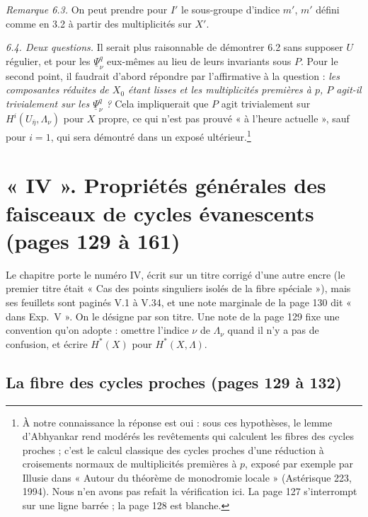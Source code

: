 \documentclass[11pt,a4paper]{article}
\begin{document}
\emph{Remarque 6.3.} On peut prendre pour $I'$ le sous-groupe d'indice $m'$, $m'$
défini comme en 3.2 à partir des multiplicités sur $X'$.

\emph{6.4. Deux questions.} Il serait plus raisonnable de démontrer 6.2 sans
supposer $U$ régulier, et pour les $\underline\Psi^q_\nu$ eux-mêmes au lieu de
leurs invariants sous $P$. Pour le second point, il faudrait d'abord répondre par
l'affirmative à la question : \emph{les composantes réduites de $X_0$ étant
lisses et les multiplicités premières à $p$, $P$ agit-il trivialement sur les
$\underline\Psi^q_\nu$ ?} Cela impliquerait que $P$ agit trivialement sur
$H^i(U_{\bar\eta}, \Lambda_\nu)$ pour $X$ propre, ce qui n'est pas prouvé
« à l'heure actuelle », sauf pour $i = 1$, qui sera démontré dans un exposé
ultérieur.\footnote{À notre connaissance la réponse est oui : sous ces
hypothèses, le lemme d'Abhyankar rend modérés les revêtements qui calculent les
fibres des cycles proches ; c'est le calcul classique des cycles proches d'une
réduction à croisements normaux de multiplicités premières à $p$, exposé par
exemple par Illusie dans « Autour du théorème de monodromie locale »
(Astérisque 223, 1994). Nous n'en avons pas
refait la vérification ici. La page 127 s'interrompt sur une ligne barrée ; la
page 128 est blanche.}

\section*{« IV ». Propriétés générales des faisceaux de cycles évanescents (pages 129 à 161)}

Le chapitre porte le numéro IV, écrit sur un titre corrigé d'une autre encre
(le premier titre était « Cas des points singuliers isolés de la fibre spéciale »),
mais ses feuillets sont paginés V.1 à V.34, et une note marginale de la page
130 dit « dans Exp.\ V ». On le désigne par son titre. Une note de la page 129
fixe une convention qu'on adopte : omettre l'indice $\nu$ de $\Lambda_\nu$ quand
il n'y a pas de confusion, et écrire $H^*(X)$ pour $H^*(X, \Lambda)$.

\subsection*{La fibre des cycles proches (pages 129 à 132)}
\end{document}
